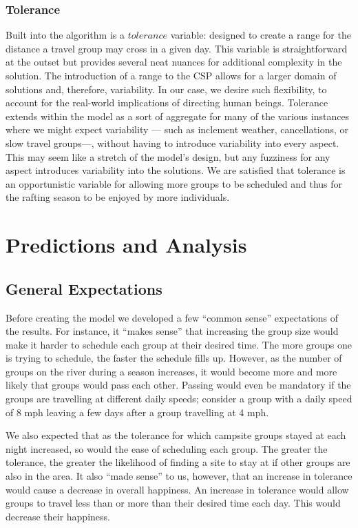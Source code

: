 \documentclass[11pt]{article} %
\begin{document}
\subsubsection{Tolerance}
Built into the algorithm is a $tolerance$ variable: designed to create a
range for the distance a travel group may cross in a given day.  This variable
is straightforward at the outset but provides several neat nuances for additional
complexity in the solution.  The introduction of a range to the CSP allows
for a larger domain of solutions and, therefore, variability.  In our case,
we desire such flexibility, to account for the real-world implications of
directing human beings.  Tolerance extends within the model as a sort of
aggregate for many of the various instances where we might expect variability
--- such as inclement weather, cancellations, or slow travel groups---,
without having to introduce variability into every aspect.  This may seem
like a stretch of the model's design, but any fuzziness for
any aspect introduces variability into the solutions.  We are satisfied that
tolerance is an opportunistic variable for allowing more groups to be
scheduled and thus for the rafting season to be enjoyed by more individuals.



\section{Predictions and Analysis}


\subsection{General Expectations}
\label{sec:expectations}
Before creating the model we developed a few “common sense” expectations of
the results. For instance, it “makes sense” that increasing the group size
would make it harder to schedule each group at their desired time. The more
groups one is trying to schedule, the faster the schedule fills up. However,
as the number of groups on the river during a season increases, it would
become more and more likely that groups would pass each other. Passing
would even be mandatory if the groups are travelling at different daily
speeds; consider a group with a daily speed of 8 mph leaving a few days
after a group travelling at 4 mph.

We also expected that as the tolerance for which campsite groups stayed at
each night increased, so would the ease of scheduling each group. The
greater the tolerance, the greater the likelihood of finding a site to stay
at if other groups are also in the area. It also “made sense” to us, however,
that an increase in tolerance would cause a decrease in overall happiness.
An increase in tolerance would allow groups to travel less than or more
than their desired time each day. This would decrease their happiness.
\end{document}
